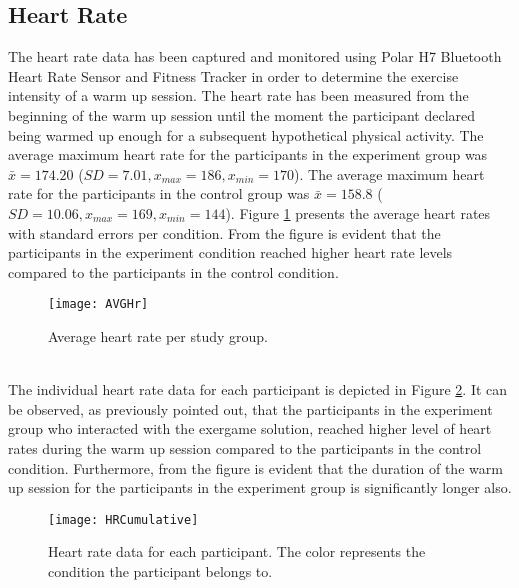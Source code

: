 \subsection{Heart Rate}
The heart rate data has been captured and monitored using Polar H7 Bluetooth Heart Rate Sensor and Fitness Tracker in order to determine the exercise intensity of a warm up session. The heart rate has been measured from the beginning of the warm up session until the moment the participant declared being warmed up enough for a subsequent hypothetical physical activity. The average maximum heart rate for the participants in the experiment group was \begin{math}\bar{x} = 174.20 \end{math} (\begin{math} SD= 7.01, x_{max}=186, x_{min}=170 \end{math}). The average maximum heart rate for the participants in the control group was \begin{math}\bar{x} = 158.8 \end{math} (\begin{math} SD= 10.06, x_{max}= 169, x_{min}= 144\end{math}). Figure \ref{fig:hrdata} presents the average heart rates with standard errors per condition. From the figure is evident that the participants in the experiment condition reached higher heart rate levels compared to the participants in the control condition.\\ %
\begin{figure}[h]
    \centering
    \texttt{[image: AVGHr]}
    \caption{Average heart rate per study group.}
    \label{fig:hrdata}
\end{figure}\\
The individual heart rate data for each participant is depicted in Figure \ref{fig:hrCumulative}. It can be observed, as previously pointed out, that the participants in the experiment group who interacted with the exergame solution, reached higher level of heart rates during the warm up session compared to the participants in the control condition. Furthermore, from the figure is evident that the duration of the warm up session for the participants in the experiment group is significantly longer also.\pagebreak
\begin{figure}[h]
    \centering
    \texttt{[image: HRCumulative]}
    \caption{Heart rate data for each participant. The color represents the condition the participant belongs to.}
    \label{fig:hrCumulative}
\end{figure}\\
